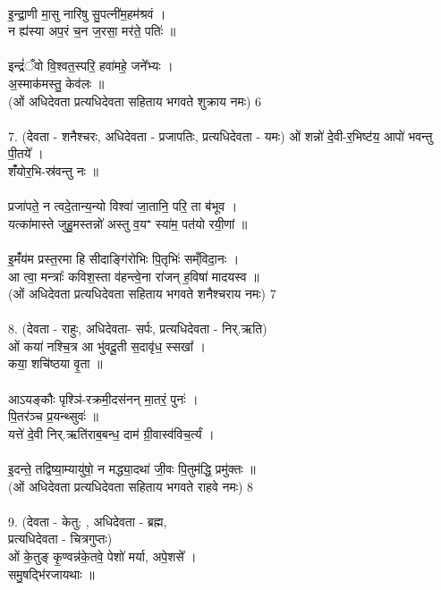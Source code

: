 \\
इ॒न्द्रा॒णी मा॒सु नारि॑षु सु॒पत्नी॑म॒हम॑श्रवं ।\\
न ह्य॑स्या अप॒रं च॒न ज॒रसा॒ मर॑ते॒ पतिः॑ ॥\\
\\
इन्द्रं॑ँवो वि॒श्वत॒स्परि॒ हवा॑महे॒ जने᳚भ्यः ।\\
अ॒स्माक॑मस्तु॒ केव॑लः ॥\\
(ओं अधिदेवता प्रत्यधिदेवता सहिताय भगवते शुक्राय नमः) 6\\
\\
7. (देवता - शनैश्चरः, अधिदेवता - प्रजापतिः,
प्रत्यधिदेवता - यमः)
ओं शन्नो॑ दे॒वी-र॒भिष्ट॑य॒ आपो॑ भवन्तु पी॒तये᳚ ।\\
शंँयोर॒भि-स्र॑वन्तु नः ॥\\
\\
प्रजा॑पते॒ न त्वदे॒तान्य॒न्यो विश्वा॑ जा॒तानि॒ परि॒ ता ब॑भूव ।\\
यत्का॑मास्ते जुहु॒मस्तन्नो॑ अस्तु व॒यꣲ स्या॑म॒ पत॑यो रयी॒णां ॥\\
\\
इ॒मंँय॑म प्रस्त॒रमा हि सीदाङ्गि॑रोभिः पि॒तृभिः॑ सम्ँविदा॒नः ।\\
आ त्वा॒ मन्त्राः᳚ कविश॒स्ता व॑हन्त्वे॒ना रा॑जन् ह॒विषा॑ मादयस्व ॥\\
(ओं अधिदेवता प्रत्यधिदेवता सहिताय भगवते शनैश्चराय नमः) 7\\
\\
8. (देवता - राहुः, अधिदेवता- सर्पः, प्रत्यधिदेवता - निर्.ऋति)\\
ओं कया॑ नश्चि॒त्र आ भु॑वदू॒ती स॒दावृ॑ध॒ स्सखा᳚ ।\\
कया॒ शचि॑ष्ठया वृ॒ता ॥\\
\\
आऽयङ्कौः पृश्ञि॑-रक्रमी॒दस॑नन् मा॒तरं॒ पुनः॑ ।\\
पि॒तर॑ञ्च प्र॒यन्थ्सुवः॑ ॥\\
यत्ते॑ दे॒वी निर्.ऋति॑राब॒बन्ध॒ दाम॑ ग्री॒वास्व॑विच॒र्त्यं ।\\
\\
इ॒दन्ते॒ तद्विष्या॒म्यायु॑षो॒ न मद्ध्या॒दथा॑ जी॒वः पि॒तुम॑द्धि॒ प्रमु॑क्तः ॥\\
(ओं अधिदेवता प्रत्यधिदेवता सहिताय भगवते राहवे नमः) 8\\
\\
9. (देवता - केतु: , अधिदेवता - ब्रह्म,\\
प्रत्यधिदेवता - चित्रगुप्तः)\\
ओं के॒तुङ् कृ॒ण्वन्न॑के॒तवे॒ पेशो॑ मर्या, अपे॒शसे᳚ ।\\
समु॒षद्भि॑रजायथाः ॥\\
